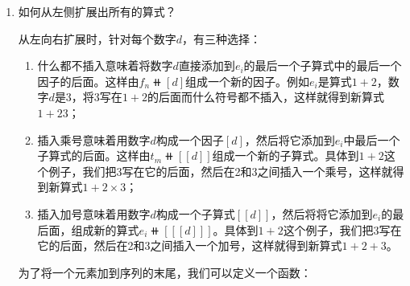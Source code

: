 \documentclass[UTF8]{article}
\begin{document}
\begin{enumerate}
接下来我们再化简$product \circ (map\ dec)$部分

\[
\resizebox{\textwidth}{!}{\ensuremath{
\begin{array}{cll}
  & (product \circ (map\ dec))\ t \\
= & product\ (map\ dec\ t) & \text{函数组合} \\
  & \{ \text{$product$展开为叠加形式，$map$展开为构建形式} \} \\
= & \pmb{foldr}\ (\times)\ 1\ (\pmb{build}\ (\oplus\ z \mapsto foldr\ (d\ ds \mapsto (dec\ d) \oplus ds)\ z\ t)) \\
= & (\oplus\ z \mapsto foldr (d\ ds \mapsto (dec\ d) \oplus ds)\ z\ t)\ (\times)\ 1 & \text{融合律} \\
= & foldr\ (d\ ds \mapsto (dec\ d) \times ds)\ 1\ t & \text{$\beta$-规约} \\
= & foldr\ ((\times) \circ fork\ (dec, id))\ 1\ t & \text{定义$fork(f, g)\ x = (f\ x, g\ x)$} \\
\end{array}
}}
\]

接着把这个结果代入之前的$f$，得到最终化简的结果：

\[
eval = foldr\ (t\ ts \mapsto (foldr\ ((\times) \circ fork\ (dec, id))\ 1\ t) + ts)\ 0
\]

\item{如何从左侧扩展出所有的算式？}

从左向右扩展时，针对每个数字$d$，有三种选择：

\begin{enumerate}
\item 什么都不插入意味着将数字$d$直接添加到$e_i$的最后一个子算式中的最后一个因子的后面。这样由$f_n \doubleplus [d]$组成一个新的因子。例如$e_i$是算式$1 + 2$，数字$d$是3，将3写在$1 + 2$的后面而什么符号都不插入，这样就得到新算式$1 + 23$；
\item 插入乘号意味着用数字$d$构成一个因子$[d]$，然后将它添加到$e_i$中最后一个子算式的后面。这样由$t_m \doubleplus [[d]]$组成一个新的子算式。具体到$1 + 2$这个例子，我们把3写在它的后面，然后在2和3之间插入一个乘号，这样就得到新算式$1 + 2 \times 3$；
\item 插入加号意味着用数字$d$构成一个子算式$[[d]]$，然后将将它添加到$e_i$的最后面，组成新的算式$e_i \doubleplus [[[d]]]$。具体到$1 + 2$这个例子，我们把3写在它的后面，然后在2和3之间插入一个加号，这样就得到新算式$1 + 2 + 3$。
\end{enumerate}

为了将一个元素加到序列的末尾，我们可以定义一个函数：


\end{enumerate}
\end{document}
